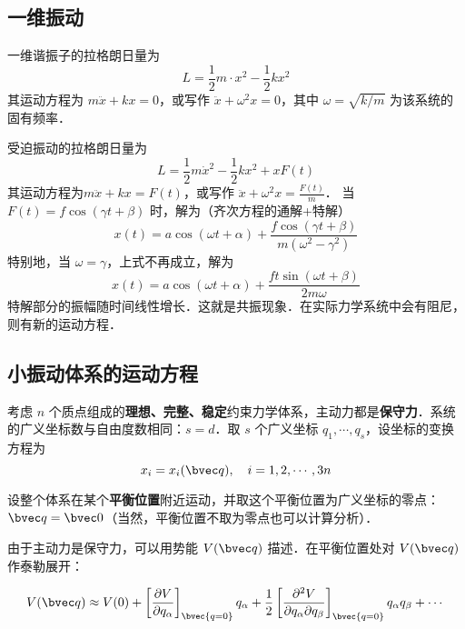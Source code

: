 

\subsection{一维振动}
一维谐振子的拉格朗日量为
\begin{equation}
L=\frac{1}{2}m\cdot{x}^2-\frac{1}{2}kx^2
\end{equation}
其运动方程为 $m\ddot {x}+kx=0$，或写作 $\ddot{x}+\omega^2 x=0$，其中 $\omega=\sqrt{k/m}$ 为该系统的固有频率．

受迫振动的拉格朗日量为 
\begin{equation}
L=\frac{1}{2}m\dot{x}^2-\frac{1}{2}kx^2+xF(t)
\end{equation}
其运动方程为$m\ddot{x}+kx=F(t)$，或写作 $\ddot{x}+\omega^2 x=\frac{F(t)}{m}$．
当 $F(t)=f\cos(\gamma t+\beta)$ 时，解为（齐次方程的通解+特解）
\begin{equation}
x(t)=a\cos(\omega t+\alpha)+\frac{f\cos(\gamma t+\beta)}{m(\omega^2-\gamma^2)}
\end{equation}
特别地，当 $\omega=\gamma$，上式不再成立，解为
\begin{equation}
x(t)=a \cos(\omega t+\alpha)+\frac{ft \sin(\omega t+\beta)}{2m\omega}
\end{equation}
特解部分的振幅随时间线性增长．这就是共振现象．在实际力学系统中会有阻尼，则有新的运动方程．

\subsection{小振动体系的运动方程}
考虑 $n$ 个质点组成的\textbf{理想、完整、稳定}约束力学体系，主动力都是\textbf{保守力}．系统的广义坐标数与自由度数相同：$s=d$．取 $s$ 个广义坐标 $q_1,\cdots,q_s$，设坐标的变换方程为
\begin{equation}
x_i = x_i(\bvec q),\ \ \  i=1,2,\cdots,3n
\end{equation}

设整个体系在某个\textbf{平衡位置}附近运动，并取这个平衡位置为广义坐标的零点：$\bvec q=\bvec 0$（当然，平衡位置不取为零点也可以计算分析）．

由于主动力是保守力，可以用势能 $V(\bvec q)$ 描述．在平衡位置处对 $V(\bvec q)$ 作泰勒展开：

\begin{equation}
V(\bvec q)\approx V(0)+\left[\frac{\partial V}{\partial q_\alpha}\right]_\bvec {q=0} q_\alpha+\frac{1}{2}\left[\frac{\partial^2V}{\partial q_\alpha\partial q_\beta}\right]_\bvec{q=0}q_\alpha q_\beta+\cdots
\end{equation}

